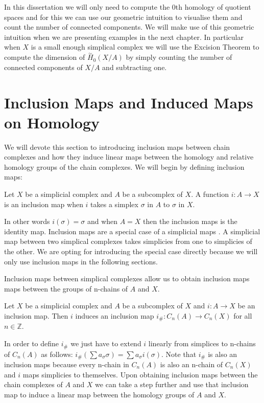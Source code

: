 In this dissertation we will only need to compute the 0th homology of quotient spaces and for this we can use our geometric intuition to visualise them and count the number of connected components. We will make use of this geometric intuition when we are presenting examples in the next chapter. In particular when $X$ is a small enough simplical complex we will use the Excision Theorem to compute the dimension of $\overset{\sim}{H}_0(X/A)$ by simply counting the number of connected components of $X/A$ and subtracting one.


\section{Inclusion Maps and Induced Maps on Homology}


We will devote this section to introducing inclusion maps between chain complexes and how they induce linear maps between the homology and relative homology groups of the chain complexes. We will begin by defining inclusion maps:

\begin{defn} Let $X$ be a simplicial complex and $A$ be a subcomplex of $X$. A function $i: A \to X$ is an inclusion map when $i$ takes a simplex $\sigma$ in $A$ to $\sigma$ in $X$.
\end{defn}

In other words $i(\sigma) = \sigma$ and when $A = X$ then the inclusion maps is the identity map. Inclusion maps are a special case of a simplicial maps \cite[p. 52]{combinatorial-algebraic-topology}. A simplicial map between two simplical complexes takes simplicies from one to simplicies of the other. We are opting for introducing the special case directly because we will only use inclusion maps in the following sections.

Inclusion maps between simplical complexes allow us to obtain inclusion maps maps between the groups of n-chains of $A$ and $X$.

\begin{defn} Let $X$ be a simplicial complex and $A$ be a subcomplex of $X$ and $i: A \to X$ be an inclusion map. Then $i$ induces an inclusion map $i_\#: C_n(A) \to C_n(X)$ for all $n \in \mathbb{Z}$. \end{defn}

In order to define $i_\#$ we just have to extend $i$ linearly from simplices to n-chains of $C_n(A)$ as follows: $i_\#(\sum a_\sigma \sigma) = \sum a_\sigma i(\sigma)$. Note that $i_\#$ is also an inclusion maps because every n-chain in $C_n(A)$ is also an n-chain of $C_n(X)$ and $i$ maps simplicies to themselves. Upon obtaining inclusion maps between the chain complexes of $A$ and $X$ we can take a step further and use that inclusion map to induce a linear map between the homology groups of $A$ and $X$.

